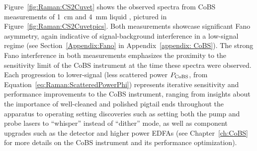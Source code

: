 Figure~\ref{fig:Raman:CS2Cuvet} shows the observed spectra from \ac{CoBS} measurements of \SI{1}{\centi\meter} and \SI{4}{\milli\meter} liquid , pictured in Figure~\ref{fig:Raman:CS2Cuvetpics}. Both measurements showcase significant Fano asymmetry, again indicative of signal-background interference in a low-signal regime (see Section~\ref{Appendix:Fano} in Appendix~\ref{appendix: CoBS}). The strong Fano interference in both measurements emphasizes the proximity to the sensitivity limit of the \ac{CoBS} instrument at the time these spectra were observed. Each progression to lower-signal (less scattered power \(P_{\rm CoBS}\), from Equation~\ref{eq:Raman:ScatteredPowerPhi}) represents iterative sensitivity and performance improvements to the \ac{CoBS} instrument, ranging from insights about the importance of well-cleaned and polished pigtail ends throughout the apparatus to operating setting discoveries such as setting both the pump and probe lasers to ``whisper'' instead of ``dither'' mode, as well as component upgrades such as the detector and higher power \ac{EDFA}s (see Chapter~\ref{ch:CoBS} for more details on the \ac{CoBS} instrument and its performance optimization).

